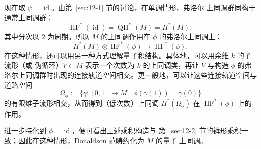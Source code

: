 现在取 $\psi=\operatorname{id}$。由第~\ref{sec:12-1} 节的讨论，在单调情形，弗洛尔
上同调群同构于通常上同调群：
\[
  \operatorname{HF}^*(\operatorname{id})
  =\operatorname{QH}^*(M)=H^*(M),
\]
其中分次以 $2$ 为周期。所以 $M$ 的上同调作用在 $\phi$ 的弗洛尔上同调上：
\[
  H^*(M)\otimes\operatorname{HF}^*(\phi)
  \longrightarrow\operatorname{HF}^*(\phi).
\]
在这种情形，还可以用另一种方式理解量子积结构。具体地，可以用余维 $k$ 的子流形（或
伪循环）$V\subset M$ 表示一个次数为 $k$ 的上同调类，再让 $V$ 与构造
$\phi$ 的弗洛尔上同调群时出现的连接轨道空间相交。更一般地，可以让这些连接轨道空间与
道路空间
\[
  \Omega_\phi:=\{\gamma:[0,1]\to M\mid \phi(\gamma(1))=\gamma(0)\}
\]
的有限维子流形相交，从而得到（低次数）上同调 $H^*(\Omega_\phi)$ 在
$\operatorname{HF}^*(\phi)$ 上的作用。

进一步特化到 $\phi=\operatorname{id}$，便可看出上述乘积构造与
第~\ref{sec:12-2} 节的裤形乘积一致；因此在这种情形，Donaldson 范畴约化为 $M$ 的量子
上同调。

